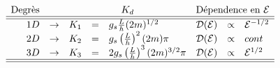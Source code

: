 \begin{enumerate}
                $$
                \begin{array}{rrrclrcl}                	 
                	\mbox{Degrès} & & \multicolumn{3}{c}{K_d } & \multicolumn{3}{c}{\mbox{Dépendence en $\mathcal{E}$}}\\ 
                	\hline
                	\hline
                	1 D & \rightarrow & K_1 & = & g_s \frac{L}{h} (2m)^{1/2} & \cD(\cE) & \propto & \cE^{-1/2} \\
                    2 D & \rightarrow &  K_2 & = & g_s \left ( \frac{L}{h} \right )^2 (2m ) \pi & \cD(\cE) & \propto &  cont \\
                    3 D & \rightarrow & K_3 & = & 2 g_s \left ( \frac{L}{h} \right )^3 (2m )^{3/2} \pi   & \cD(\cE)  & \propto  &\cE^{1/2} \\ 
                    \hline
                	\hline               		
                \end{array}
                $$
                


                
                   
                
            \end{enumerate}
                
        
	
	
	
	
	
	
	
	
	
	
	
	
	
	
	
	
	
	
	
	
	
	
	
	
	
	
	
	
	
	
	
	
	
	
	
	
	
	
	
	
	
	
	
	
	